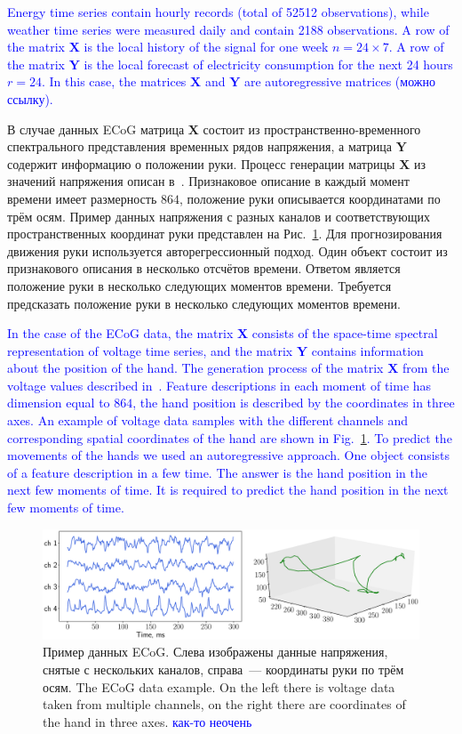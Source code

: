 \documentclass[12pt,twoside]{article}
\newcommand{\bY}{\mathbf{Y}}
\newcommand{\bX}{\mathbf{X}}
\begin{document}
\textcolor{blue}{
Energy time series contain hourly records (total of 52512 observations), while weather time series were measured daily and contain 2188 observations. 
A row of the matrix $\bX$ is the local history of the signal for one week $n = 24 \times 7$. A row of the matrix $\bY$ is the local forecast of electricity consumption for the next 24 hours $r = 24$. In this case, the matrices $\bX$ and $\bY$ are autoregressive matrices (можно ссылку).}


В случае данных ECoG матрица $\bX$ состоит из пространственно-временного спектрального представления временных рядов напряжения, а матрица $\bY$ содержит информацию о положении руки. 
Процесс генерации матрицы $\bX$ из значений напряжения описан в~\cite{gasanov2017pls}. 
Признаковое описание в каждый момент времени имеет размерность $864$, положение руки описывается координатами по трём осям. 
Пример данных напряжения с разных каналов и соответствующих пространственных координат руки представлен на Рис.~\ref{fig::ecog_data}.
Для прогнозирования движения руки используется авторегрессионный подход.
Один объект состоит из признакового описания в несколько отсчётов времени. 
Ответом является положение руки в несколько следующих моментов времени.
Требуется предсказать положение руки в несколько следующих моментов времени.

\textcolor{blue}{
In the case of the ECoG data, the matrix $\bX$ consists of the space-time spectral representation of voltage time series, and the matrix $\bY$ contains information about the position of the hand. 
The generation process of the matrix $\bX$ from the voltage values described in~\cite{gasanov2017pls}. 
Feature descriptions in each moment of time has dimension equal to $864$, the hand position is described by the coordinates in three axes. 
An example of voltage data samples with the different channels and corresponding spatial coordinates of the hand are shown in Fig.~\ref{fig::ecog_data}.
To predict the movements of the hands we used an autoregressive approach.
One object consists of a feature description in a few time. 
The answer is the hand position in the next few moments of time.
It is required to predict the hand position in the next few moments of time.}

\begin{figure}
	\includegraphics[width=\linewidth]{figs/ecog_data.eps}
	\caption{Пример данных ECoG. Слева изображены данные напряжения, снятые с нескольких каналов, справа~--- координаты руки по трём осям. The ECoG data example. On the left there is voltage data taken from multiple channels, on the right there are coordinates of the hand in three axes. \textcolor{blue}{как-то неочень}}
	\label{fig::ecog_data}
\end{figure}
\end{document}
